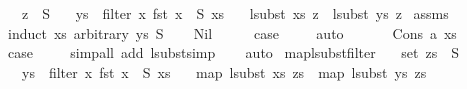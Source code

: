\begin{isabellebody}
\ \ \ {\isachardoublequoteopen}z\ {\isasymin}\ S{\isachardoublequoteclose}\isanewline
\ \ \ {\isachardoublequoteopen}ys\ {\isacharequal}{\kern0pt}\ filter\ {\isacharparenleft}{\kern0pt}{\isasymlambda}x{\isachardot}{\kern0pt}\ fst\ x\ {\isasymin}\ S{\isacharparenright}{\kern0pt}\ xs{\isachardoublequoteclose}\isanewline
\ \ \ {\isachardoublequoteopen}lsubst\ xs\ z\ {\isacharequal}{\kern0pt}\ lsubst\ ys\ z{\isachardoublequoteclose}\isanewline
%
\isadelimproof
%
\endisadelimproof
%
\isatagproof
{}\isamarkupfalse%
\ assms\isanewline
{}\isamarkupfalse%
\ {\isacharparenleft}{\kern0pt}induct\ xs\ arbitrary{\isacharcolon}{\kern0pt}\ ys\ S{\isacharparenright}{\kern0pt}\isanewline
\ \ \isamarkupfalse%
\ Nil\isanewline
\ \ \isamarkupfalse%
\ \isamarkupfalse%
\ {\isacharquery}{\kern0pt}case\ \isanewline
\ \ \isamarkupfalse%
\ auto\isanewline
\ \ \isamarkupfalse%
\isanewline
{}\isamarkupfalse%
\isanewline
\ \ \isamarkupfalse%
\ {\isacharparenleft}{\kern0pt}Cons\ a\ xs{\isacharparenright}{\kern0pt}\isanewline
\ \ \isamarkupfalse%
\ \isamarkupfalse%
\ {\isacharquery}{\kern0pt}case\ \isanewline
\ \ \isamarkupfalse%
\ {\isacharparenleft}{\kern0pt}simp{\isacharunderscore}{\kern0pt}all\ add{\isacharcolon}{\kern0pt}\ lsubst{\isacharunderscore}{\kern0pt}simp{\isacharparenright}{\kern0pt}\isanewline
\ \ \isamarkupfalse%
\ auto\isanewline
{}\isamarkupfalse%
%
\endisatagproof
{\isafoldproof}%
%
\isadelimproof
\isanewline
%
\endisadelimproof
\isanewline
\isanewline
{}\isamarkupfalse%
\ map{\isacharunderscore}{\kern0pt}lsubst{\isacharunderscore}{\kern0pt}filter{\isacharcolon}{\kern0pt}\isanewline
\ \ \ {\isachardoublequoteopen}set\ zs\ {\isasymsubseteq}\ S{\isachardoublequoteclose}\isanewline
\ \ \ {\isachardoublequoteopen}ys\ {\isacharequal}{\kern0pt}\ filter\ {\isacharparenleft}{\kern0pt}{\isasymlambda}x{\isachardot}{\kern0pt}\ fst\ x\ {\isasymin}\ S{\isacharparenright}{\kern0pt}\ xs{\isachardoublequoteclose}\isanewline
\ \ \ {\isachardoublequoteopen}map\ {\isacharparenleft}{\kern0pt}lsubst\ xs{\isacharparenright}{\kern0pt}\ zs\ {\isacharequal}{\kern0pt}\ map\ {\isacharparenleft}{\kern0pt}lsubst\ ys{\isacharparenright}{\kern0pt}\ zs{\isachardoublequoteclose}\isanewline

\end{isabellebody}
